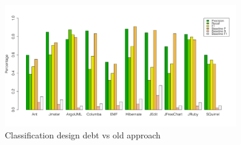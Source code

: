 \appendix{}
\label{sec:appendix}

\begin{figure}[thb!]
  \centering
  \includegraphics[width=0.90\textwidth]{figures/baseline_comparison_design.pdf}
  \caption{Classification design debt vs old approach}
  \label{fig:design_vs_baseline}
\end{figure}

